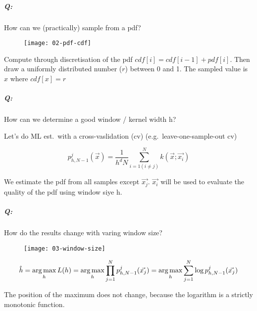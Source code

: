 \subparagraph{Q:} How can we (practically) sample from a pdf?

\begin{figure}[H]
  \centering
  \texttt{[image: 02-pdf-cdf]}
\end{figure}

Compute through discretisation of the pdf $cdf[i] = cdf[i-1] + pdf[i]$. Then draw a uniformly distributed number ($r$) between 0 and 1. The sampled value is $x$ where $cdf[x] = r$


\subparagraph{Q:} How can we determine a good window / kernel width h?

Let's do ML est.\ with a cross-vaslidation (cv) (e.g.\ leave-one-sample-out cv)

\begin{equation*}
  p_{h,N-1}^j(\vec{x}) = \dfrac{1}{h^d N} \sum_{i=1 (i \neq j)}^N k(\vec{x}; \vec{x_i})
\end{equation*}

We estimate the pdf from all samples except $\vec{x_j}$. $\vec{x_i}$ will be used to evaluate the quality of the pdf using window siye h.

\subparagraph{Q:} How do the results change with varing window size?

\begin{figure}[H]
  \centering
  \texttt{[image: 03-window-size]}
\end{figure}

\begin{equation*}
\hat{h} = \operatorname*{arg\,max}_h L(h) = \operatorname*{arg\,max}_h \prod_{j=1}^N p_{h,N-1}^j(\vec{x_j}) = \operatorname*{arg\,max}_h \sum_{j=1}^N \log p_{h,N-1}^j(\vec{x_j})
\end{equation*}

The position of the maximum does not change, because the logarithm is a strictly monotonic function.
